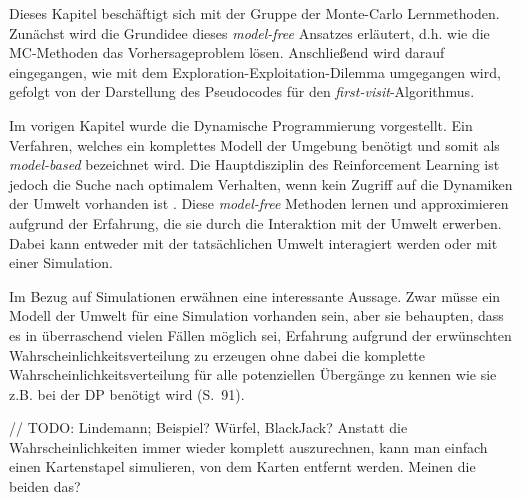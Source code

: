 Dieses Kapitel beschäftigt sich mit der Gruppe der Monte-Carlo Lernmethoden. Zunächst wird die Grundidee dieses \textit{model-free} Ansatzes erläutert, d.h. wie die MC-Methoden das Vorhersageproblem lösen. Anschließend wird darauf eingegangen, wie mit dem Exploration-Exploitation-Dilemma umgegangen wird, gefolgt von der Darstellung des Pseudocodes für den \textit{first-visit}-Algorithmus.
\par 

Im vorigen Kapitel wurde die Dynamische Programmierung vorgestellt. Ein Verfahren, welches ein komplettes Modell der Umgebung benötigt und somit als \textit{model-based} bezeichnet wird. Die Hauptdisziplin des Reinforcement Learning ist jedoch die Suche nach optimalem Verhalten, wenn kein Zugriff auf die Dynamiken der Umwelt vorhanden ist \cite[S.~27]{Wiering}. Diese \textit{model-free} Methoden lernen und approximieren aufgrund der Erfahrung, die sie durch die Interaktion mit der Umwelt erwerben. Dabei kann entweder mit der tatsächlichen Umwelt interagiert werden oder mit einer Simulation.
\par 
Im Bezug auf Simulationen erwähnen \cite{Sutton1998} eine interessante Aussage. Zwar müsse ein Modell der Umwelt für eine Simulation vorhanden sein, aber sie behaupten, dass es in überraschend vielen Fällen möglich sei, Erfahrung aufgrund der erwünschten Wahrscheinlichkeitsverteilung zu erzeugen ohne dabei die komplette Wahrscheinlichkeitsverteilung für alle potenziellen Übergänge zu kennen wie sie z.B. bei der DP benötigt wird (S.~91).
\par 
// TODO: Lindemann; Beispiel? Würfel, BlackJack? Anstatt die Wahrscheinlichkeiten immer wieder komplett auszurechnen, kann man einfach einen Kartenstapel simulieren, von dem Karten entfernt werden. Meinen die beiden das?
\par 

